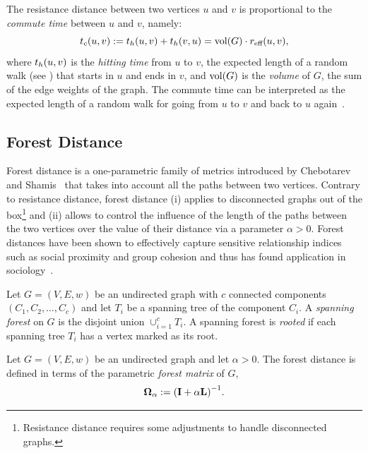 The resistance distance between
two vertices $u$ and $v$ is proportional to the
\emph{commute time} between $u$ and $v$, namely:
%
\[t_c(u, v) := t_h(u, v) + t_h(v, u) = \text{vol}(G)\cdot r_{\text{eff}}(u, v),\]
%
where $t_h(u, v)$ is the \emph{hitting time} from $u$ to $v$, \ie the
expected length of a random walk (see ) that starts in
$u$ and ends in $v$, and $\text{vol}(G)$ is the \emph{volume} of $G$, \ie the sum of
the edge weights of the graph. The commute time can be interpreted as the
expected length of a random walk for going from $u$ to $v$ and back to $u$
again~\cite{DBLP:conf/stacs/BrandesF05}.

%
\subsection{Forest Distance}
\label{sec:prelim:forest-distance}
%
Forest distance is a one-parametric family of metrics introduced by Chebotarev
and Shamis~\cite{chebotarev2000forest,DBLP:journals/endm/ChebotarevS02}
that takes into account all the paths between two vertices.
Contrary to resistance distance, forest distance (i) applies to disconnected
graphs out of the box\footnote{Resistance distance requires some adjustments to
handle disconnected graphs.}
and (ii) allows to control the influence of the length of
the paths between the two vertices over the value of their distance via a
parameter $\alpha > 0$.
Forest distances have been shown to effectively capture sensitive relationship
indices such as social proximity and group cohesion and thus has found
application in sociology~\cite{DBLP:journals/corr/abs-math-0602070}.

\begin{definition}
Let $G = (V, E, w)$ be an undirected graph with $c$ connected components $(C_1,
C_2, \ldots, C_c)$ and let $T_i$ be a spanning tree of the component $C_i$.
A \emph{spanning forest} on $G$ is the disjoint union $\cup_{i = 1}^c T_i$. A
spanning forest is \emph{rooted} if each spanning tree $T_i$ has a vertex
marked as its root.
\end{definition}

Let $G = (V, E, w)$ be an undirected graph and let $\alpha > 0$.
The forest distance is defined in terms of the parametric \emph{forest matrix}
of $G$, \ie
\begin{equation}
\label{eq:forest-matrix}
\Fmatp := \roundb{\Ident + \alpha\Lapl}^{-1}.
\end{equation}

